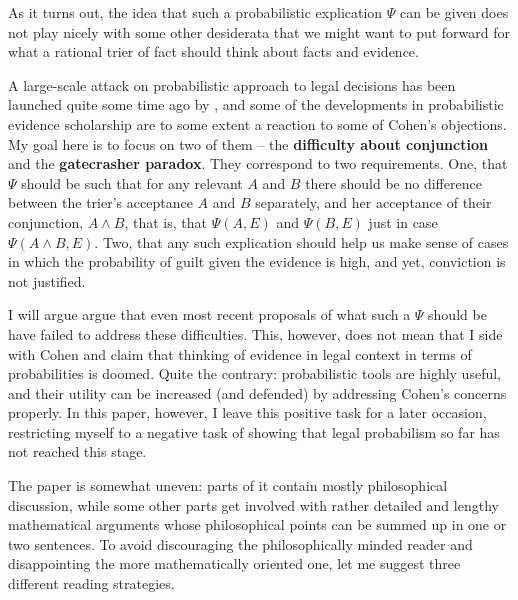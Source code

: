 \documentclass{ifcolog}
\begin{document}
As it turns out, the idea that such a probabilistic explication $\Psi$ can be given  does not play nicely with some other desiderata that we might want to put forward for what a rational trier of fact should think about facts and evidence.

 A large-scale attack on probabilistic approach to legal decisions has been \linebreak launched quite some time ago by \citet{Cohen1977The-probable-an}, and some of the  developments in probabilistic evidence scholarship are to some extent  a reaction to some of Cohen's objections.  My goal here is to focus on two of them -- the \textbf{difficulty about conjunction} and the \textbf{gatecrasher paradox}. They correspond to two requirements. One, that $\Psi$ should be such that for any relevant $A$ and $B$ there should be no difference between the trier's acceptance $A$ and $B$ separately, and her acceptance of their conjunction, $A\wedge B$, that is, that $\Psi(A,E)$ and $\Psi(B,E)$ just in case $\Psi(A\wedge B,E)$. Two, that any such explication should help us make sense of cases in which  the probability of guilt given the evidence is high, and yet, conviction is not justified. 

 I will argue argue that even most recent proposals of what such a $\Psi$ should be have failed to address these difficulties.  This, however, does not mean that I side with Cohen and claim that thinking of evidence in legal context in terms of probabilities is doomed. Quite the contrary: probabilistic tools are highly useful, and their utility can be increased (and defended) by addressing Cohen's concerns properly. In this paper, however, I leave this positive task for a later occasion, restricting myself to a negative task of showing that legal probabilism so far has not reached this stage. 


The paper is somewhat uneven: parts of it contain mostly philosophical discussion, while some other parts get involved with rather detailed and lengthy mathematical arguments whose philosophical points can be summed up in one or two sentences. To avoid discouraging the philosophically minded reader and disappointing the more mathematically oriented one, let me suggest three different reading strategies.
\end{document}
